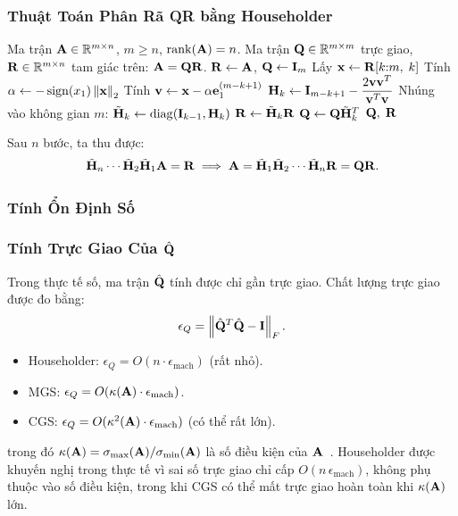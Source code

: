 \subsubsection{Thuật Toán Phân Rã QR bằng Householder}

\begin{algorithm}[H]
\caption{Phân rã QR bằng phản xạ Householder}
\label{alg:householder_qr}
\begin{algorithmic}[1]
\Require Ma trận $\mathbf{A} \in \mathbb{R}^{m \times n}$, $m \geq n$, $\operatorname{rank}(\mathbf{A}) = n$.
\Ensure Ma trận $\mathbf{Q} \in \mathbb{R}^{m \times m}$ trực giao, $\mathbf{R} \in \mathbb{R}^{m \times n}$ tam giác trên: $\mathbf{A} = \mathbf{Q}\mathbf{R}$.
\State $\mathbf{R} \leftarrow \mathbf{A}$, $\mathbf{Q} \leftarrow \mathbf{I}_m$
    \State Lấy $\mathbf{x} \leftarrow \mathbf{R}[k{:}m,\; k]$ 
    \State Tính $\alpha \leftarrow -\operatorname{sign}(x_1)\left\lVert\mathbf{x}\right\rVert_2$
    \State Tính $\mathbf{v} \leftarrow \mathbf{x} - \alpha\mathbf{e}_1^{(m-k+1)}$
    \State $\mathbf{H}_k \leftarrow \mathbf{I}_{m-k+1} - \dfrac{2\mathbf{v}\mathbf{v}^T}{\mathbf{v}^T\mathbf{v}}$
    \State Nhúng vào không gian $m$: $\tilde{\mathbf{H}}_k \leftarrow \operatorname{diag}(\mathbf{I}_{k-1}, \mathbf{H}_k)$
    \State $\mathbf{R} \leftarrow \tilde{\mathbf{H}}_k \mathbf{R}$
    \State $\mathbf{Q} \leftarrow \mathbf{Q} \tilde{\mathbf{H}}_k^T$
\EndFor
\State \Return $\mathbf{Q},\; \mathbf{R}$
\end{algorithmic}
\end{algorithm}

Sau $n$ bước, ta thu được:
\[
    \tilde{\mathbf{H}}_n \cdots \tilde{\mathbf{H}}_2 \tilde{\mathbf{H}}_1 \mathbf{A} = \mathbf{R}
    \implies \mathbf{A} = \tilde{\mathbf{H}}_1 \tilde{\mathbf{H}}_2 \cdots \tilde{\mathbf{H}}_n \mathbf{R} = \mathbf{Q}\mathbf{R}.
\]

\subsubsection{Tính Ổn Định Số}

\subsubsection{Tính Trực Giao Của $\hat{\mathbf{Q}}$}

Trong thực tế số, ma trận $\hat{\mathbf{Q}}$ tính được chỉ gần trực giao. Chất lượng
trực giao được đo bằng:
\[
    \epsilon_Q = \left\lVert\hat{\mathbf{Q}}^T\hat{\mathbf{Q}} - \mathbf{I}\right\rVert_F.
\]
\begin{itemize}
    \item Householder: $\epsilon_Q = O(n \cdot \epsilon_{\text{mach}})$ (rất nhỏ).
    \item MGS:         $\epsilon_Q = O(\kappa(\mathbf{A}) \cdot \epsilon_{\text{mach}})$.
    \item CGS:         $\epsilon_Q = O(\kappa^2(\mathbf{A}) \cdot \epsilon_{\text{mach}})$ (có thể rất lớn).
\end{itemize}
trong đó $\kappa(\mathbf{A}) = \sigma_{\max}(\mathbf{A}) / \sigma_{\min}(\mathbf{A})$ là số
điều kiện của $\mathbf{A}$~\cite{higham2002}. Householder được khuyến nghị trong thực
tế vì sai số trực giao chỉ cấp $O(n\,\epsilon_{\text{mach}})$, không phụ thuộc vào
số điều kiện, trong khi CGS có thể mất trực giao hoàn toàn khi $\kappa(\mathbf{A})$ lớn.

